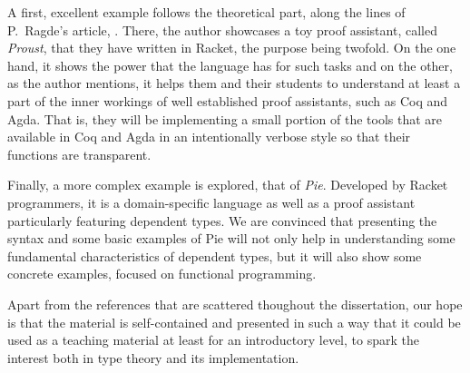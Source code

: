 A first, excellent example follows the theoretical part, along the lines of P.\ Ragde's
article, \cite{proust}. There, the author showcases a toy proof assistant,
called \emph{Proust}, that they have written in Racket, the purpose being
twofold. On the one hand, it shows the power that the language has for
such tasks and on the other, as the author mentions, it helps them and
their students to understand at least a part of the inner workings of
well established proof assistants, such as Coq and Agda. That is, they
will be implementing a small portion of the tools that are available in
Coq and Agda in an intentionally verbose style so that their functions are
transparent.

Finally, a more complex example is explored, that of \emph{Pie}. Developed by
Racket programmers, it is a domain-specific language as well as a proof
assistant particularly featuring dependent types. We are convinced that
presenting the syntax and some basic examples of Pie will not only help in
understanding some fundamental characteristics of dependent types, but it will
also show some concrete examples, focused on functional programming.

\vspace{0.3cm}

Apart from the references that are scattered thoughout the dissertation, our
hope is that the material is self-contained and presented in such a way that
it could be used as a teaching material at least for an introductory level,
to spark the interest both in type theory and its implementation.

